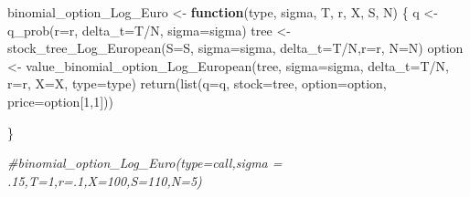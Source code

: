 \documentclass[
]{article}
\newenvironment{Shaded}{\begin{snugshade}}{\end{snugshade}}
\newcommand{\AttributeTok}[1]{\textcolor[rgb]{0.77,0.63,0.00}{#1}}
\newcommand{\CommentTok}[1]{\textcolor[rgb]{0.56,0.35,0.01}{\textit{#1}}}
\newcommand{\ControlFlowTok}[1]{\textcolor[rgb]{0.13,0.29,0.53}{\textbf{#1}}}
\newcommand{\DecValTok}[1]{\textcolor[rgb]{0.00,0.00,0.81}{#1}}
\newcommand{\FunctionTok}[1]{\textcolor[rgb]{0.00,0.00,0.00}{#1}}
\newcommand{\NormalTok}[1]{#1}
\newcommand{\OtherTok}[1]{\textcolor[rgb]{0.56,0.35,0.01}{#1}}
\newcommand{\SpecialCharTok}[1]{\textcolor[rgb]{0.00,0.00,0.00}{#1}}
\begin{document}
\begin{Shaded}
\begin{Highlighting}[]
\NormalTok{binomial\_option\_Log\_Euro }\OtherTok{\textless{}{-}} \ControlFlowTok{function}\NormalTok{(type, sigma, T, r, X, S, N) \{}
\NormalTok{  q }\OtherTok{\textless{}{-}} \FunctionTok{q\_prob}\NormalTok{(}\AttributeTok{r=}\NormalTok{r, }\AttributeTok{delta\_t=}\NormalTok{T}\SpecialCharTok{/}\NormalTok{N, }\AttributeTok{sigma=}\NormalTok{sigma)}
\NormalTok{  tree }\OtherTok{\textless{}{-}} \FunctionTok{stock\_tree\_Log\_European}\NormalTok{(}\AttributeTok{S=}\NormalTok{S, }\AttributeTok{sigma=}\NormalTok{sigma, }\AttributeTok{delta\_t=}\NormalTok{T}\SpecialCharTok{/}\NormalTok{N,}\AttributeTok{r=}\NormalTok{r, }\AttributeTok{N=}\NormalTok{N)}
\NormalTok{  option }\OtherTok{\textless{}{-}} \FunctionTok{value\_binomial\_option\_Log\_European}\NormalTok{(tree, }\AttributeTok{sigma=}\NormalTok{sigma, }\AttributeTok{delta\_t=}\NormalTok{T}\SpecialCharTok{/}\NormalTok{N, }\AttributeTok{r=}\NormalTok{r, }\AttributeTok{X=}\NormalTok{X, }\AttributeTok{type=}\NormalTok{type)}
  \FunctionTok{return}\NormalTok{(}\FunctionTok{list}\NormalTok{(}\AttributeTok{q=}\NormalTok{q, }\AttributeTok{stock=}\NormalTok{tree, }\AttributeTok{option=}\NormalTok{option, }\AttributeTok{price=}\NormalTok{option[}\DecValTok{1}\NormalTok{,}\DecValTok{1}\NormalTok{]))}
  
\NormalTok{\}}



\CommentTok{\#binomial\_option\_Log\_Euro(type=\textquotesingle{}call\textquotesingle{},sigma = .15,T=1,r=.1,X=100,S=110,N=5)}
\end{Highlighting}
\end{Shaded}
\end{document}
